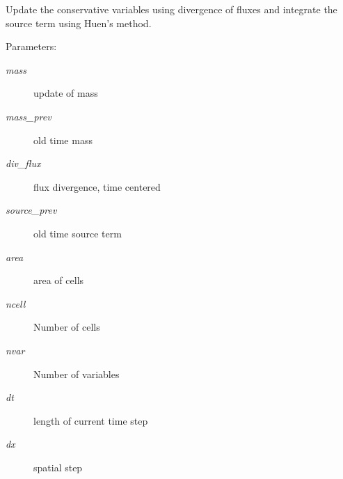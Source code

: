 Update the conservative variables using divergence of fluxes and integrate the source term using Huen's method. 

\begin{Desc}
\item[Parameters:]
\begin{description}
\item[{\em mass}]update of mass\item[{\em mass\_\-prev}]old time mass\item[{\em div\_\-flux}]flux divergence, time centered\item[{\em source\_\-prev}]old time source term\item[{\em area}]area of cells\item[{\em ncell}]Number of cells\item[{\em nvar}]Number of variables\item[{\em dt}]length of current time step\item[{\em dx}]spatial step \end{description}
\end{Desc}
